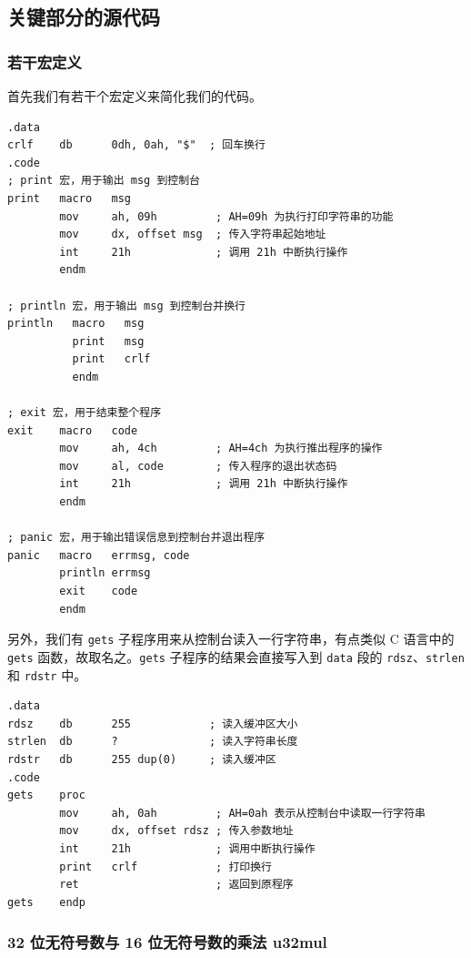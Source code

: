 \subsection{关键部分的源代码}

\subsubsection{若干宏定义}

首先我们有若干个宏定义来简化我们的代码。

\begin{lstlisting}[language={[x86masm]Assembler},morekeywords={}]
.data
crlf    db      0dh, 0ah, "$"  ; 回车换行
.code
; print 宏，用于输出 msg 到控制台
print   macro   msg
        mov     ah, 09h         ; AH=09h 为执行打印字符串的功能
        mov     dx, offset msg  ; 传入字符串起始地址
        int     21h             ; 调用 21h 中断执行操作
        endm

; println 宏，用于输出 msg 到控制台并换行
println   macro   msg
          print   msg
          print   crlf
          endm

; exit 宏，用于结束整个程序
exit    macro   code
        mov     ah, 4ch         ; AH=4ch 为执行推出程序的操作
        mov     al, code        ; 传入程序的退出状态码
        int     21h             ; 调用 21h 中断执行操作
        endm

; panic 宏，用于输出错误信息到控制台并退出程序
panic   macro   errmsg, code
        println errmsg
        exit    code
        endm
\end{lstlisting}

另外，我们有 \verb|gets| 子程序用来从控制台读入一行字符串，有点类似 C 语言中的 \verb|gets| 函数，故取名之。\verb|gets| 子程序的结果会直接写入到 \verb|data| 段的 \verb|rdsz|、\verb|strlen| 和 \verb|rdstr| 中。

\begin{lstlisting}[language={[x86masm]Assembler},morekeywords={}]
.data
rdsz    db      255            ; 读入缓冲区大小
strlen  db      ?              ; 读入字符串长度
rdstr   db      255 dup(0)     ; 读入缓冲区
.code
gets    proc
        mov     ah, 0ah         ; AH=0ah 表示从控制台中读取一行字符串
        mov     dx, offset rdsz ; 传入参数地址
        int     21h             ; 调用中断执行操作
        print   crlf            ; 打印换行
        ret                     ; 返回到原程序
gets    endp
\end{lstlisting}

\subsubsection{32 位无符号数与 16 位无符号数的乘法 u32mul}

